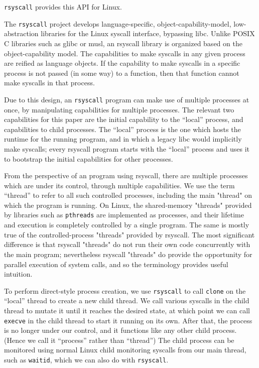 \documentclass{acmart}
\begin{document}
\texttt{rsyscall} provides this API for Linux.

The \texttt{rsyscall} project develops
language-specific, object-capability-model, low-abstraction libraries for the Linux syscall interface,
bypassing libc.
Unlike POSIX C libraries such as glibc or musl,
an rsyscall library is organized based on the object-capability model.
The capabilities to make syscalls in any given process are reified as language objects.
If the capability to make syscalls in a specific process is not passed (in some way) to a function,
then that function cannot make syscalls in that process.

Due to this design, an \texttt{rsyscall} program can make use of multiple processes at once,
by manipulating capabilities for multiple processes.
The relevant two capabilities for this paper are the initial capability to the ``local'' process,
and capabilities to child processes.
The ``local'' process is the one which hosts the runtime for the running program,
and in which a legacy libc would implicitly make syscalls;
every rsyscall program starts with the ``local'' process
and uses it to bootstrap the initial capabilities for other processes.

From the perspective of an program using rsyscall,
there are multiple processes which are under its control,
through multiple capabilities.
We use the term ``thread'' to refer to all such controlled processes,
including the main "thread" on which the program is running.
On Linux, the shared-memory "threads" provided by libraries such as \texttt{pthreads}
are implemented as processes,
and their lifetime and execution is completely controlled by a single program.
The same is mostly true of the controlled-process "threads" provided by rsyscall.
The most significant difference is that rsyscall "threads"
do not run their own code concurrently with the main program;
nevertheless rsyscall "threads" do provide the opportunity for parallel execution of system calls,
and so the terminology provides useful intuition.

To perform direct-style process creation,
we use \texttt{rsyscall} to call \texttt{clone} on the ``local'' thread to create a new child thread.
We call various syscalls in the child thread to mutate it until it reaches the desired state,
at which point we can call \texttt{execve} in the child thread to start it running on its own.
After that, the process is no longer under our control, and it functions like any other child process.
(Hence we call it ``process'' rather than ``thread'')
The child process can be monitored using normal Linux child monitoring syscalls from our main thread,
such as \texttt{waitid},
which we can also do with \texttt{rsyscall}.
\end{document}
